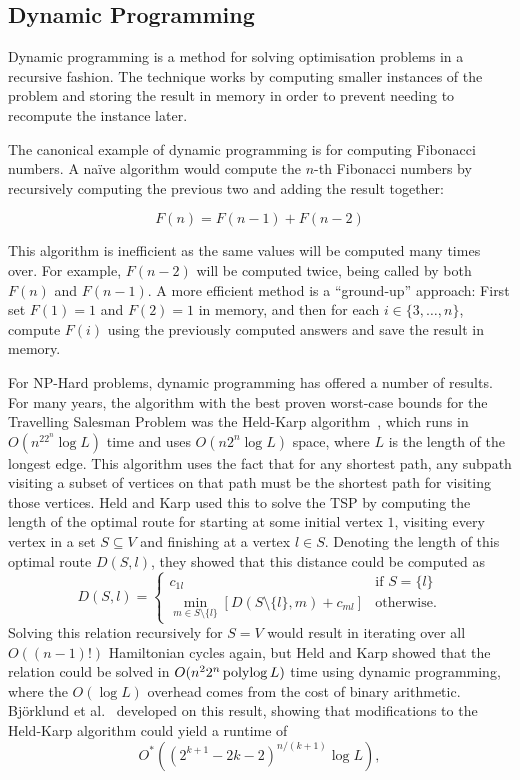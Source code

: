 \subsection{Dynamic Programming}

Dynamic programming is a method for solving optimisation problems in a recursive fashion. The technique works by computing smaller instances of the problem and storing the result in memory in order to prevent needing to recompute the instance later.

The canonical example of dynamic programming is for computing Fibonacci numbers. A na\"{i}ve algorithm would compute the $n$-th Fibonacci numbers by recursively computing the previous two and adding the result together:

$$F(n) = F(n-1) + F(n-2)$$

This algorithm is inefficient as the same values will be computed many times over. For example, $F(n-2)$ will be computed twice, being called by both $F(n)$ and $F(n-1)$. A more efficient method is a ``ground-up'' approach: First set $F(1)=1$ and $F(2)=1$ in memory, and then for each $i \in \{3,\dots,n\}$, compute $F(i)$ using the previously computed answers and save the result in memory.

For NP-Hard problems, dynamic programming has offered a number of results. For many years, the algorithm with the best proven worst-case bounds for the Travelling Salesman Problem was the Held-Karp algorithm~\cite{held1962}, which runs in $O(n^22^n\log L)$ time and uses $O(n2^n\log L)$ space, where $L$ is the length of the longest edge. This algorithm uses the fact that for any shortest path, any subpath visiting a subset of vertices on that path must be the shortest path for visiting those vertices. Held and Karp used this to solve the TSP by computing the length of the optimal route for starting at some initial vertex $1$, visiting every vertex in a set $S \subseteq V$ and finishing at a vertex $l \in S$. Denoting the length of this optimal route $D(S, l)$, they showed that this distance could be computed as
%
\begin{equation}
D(S, l) = \begin{cases} c_{1l} & \text{if } S = \{l\}\\
          \min_{m \in S \setminus \{l\}}\left[D(S \setminus \{l\}, m) + c_{ml}\right] & \text{otherwise.}
  \end{cases}
\end{equation}
%
Solving this relation recursively for $S=V$ would result in iterating over all $O((n-1)!)$ Hamiltonian cycles again, but Held and Karp showed that the relation could be solved in $O(n^22^n\operatorname{polylog} L)$ time using dynamic programming, where the $O(\log L)$ overhead comes from the cost of binary arithmetic. Bj{\"o}rklund et al.\ \cite{bjorklund2008} developed on this result, showing that modifications to the Held-Karp algorithm could yield a runtime of
%
\begin{equation}
O^*((2^{k + 1} - 2k - 2)^{n/(k + 1)}\log L),
\end{equation}

